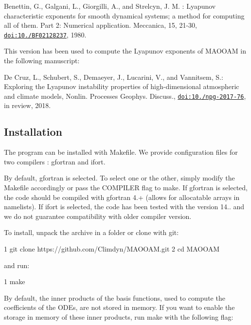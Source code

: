 \begin{DoxyItemize}
\item Benettin, G., Galgani, L., Giorgilli, A., and Strelcyn, J. M. \+: Lyapunov characteristic exponents for smooth dynamical systems; a method for computing all of them. Part 2\+: Numerical application. Meccanica, 15, 21-\/30, \href{http://dx.doi.org/10.1007/BF02128237}{\tt doi\+:10./\+B\+F02128237}, 1980.
\end{DoxyItemize}

This version has been used to compute the Lyapunov exponents of M\+A\+O\+O\+AM in the following manuscript\+:


\begin{DoxyItemize}
\item De Cruz, L., Schubert, S., Demaeyer, J., Lucarini, V., and Vannitsem, S.\+: Exploring the Lyapunov instability properties of high-\/dimensional atmospheric and climate models, Nonlin. Processes Geophys. Discuss., \href{https://doi.org/10.5194/npg-2017-76}{\tt doi\+:10./npg-\/2017-\/76}, in review, 2018. 


\end{DoxyItemize}

\subsection*{Installation}

The program can be installed with Makefile. We provide configuration files for two compilers \+: gfortran and ifort.

By default, gfortran is selected. To select one or the other, simply modify the Makefile accordingly or pass the C\+O\+M\+P\+I\+L\+ER flag to {\ttfamily make}. If gfortran is selected, the code should be compiled with gfortran 4.+ (allows for allocatable arrays in namelists). If ifort is selected, the code has been tested with the version 14.. and we do not guarantee compatibility with older compiler version.

To install, unpack the archive in a folder or clone with git\+:


\begin{DoxyCode}
1 git clone https://github.com/Climdyn/MAOOAM.git
2 cd MAOOAM
\end{DoxyCode}


and run\+:


\begin{DoxyCode}
1 make
\end{DoxyCode}
 By default, the inner products of the basis functions, used to compute the coefficients of the O\+D\+Es, are not stored in memory. If you want to enable the storage in memory of these inner products, run make with the following flag\+:


